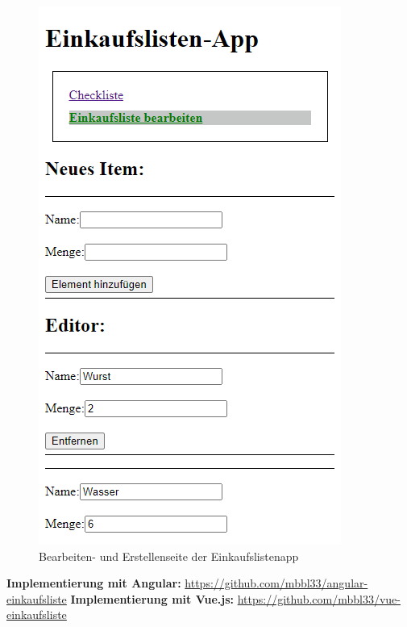 \begin{figure}[h]
\begin{minipage}[H]{.45\textwidth}
        \label{fig:checklistenseite}
    \end{minipage}
    \hspace{.1\linewidth}%
    \begin{minipage}[H]{.45\textwidth}
        \includegraphics[width=\textwidth]{img/vue-Einkaufsliste-Editor}
        \caption{Bearbeiten- und Erstellenseite der Einkaufslistenapp}
        \label{fig:editlistenseite}
    \end{minipage}
\end{figure}

\textbf{Implementierung mit Angular:} \url{https://github.com/mbbl33/angular-einkaufsliste}
\textbf{Implementierung mit Vue.js:} \url{https://github.com/mbbl33/vue-einkaufsliste}

